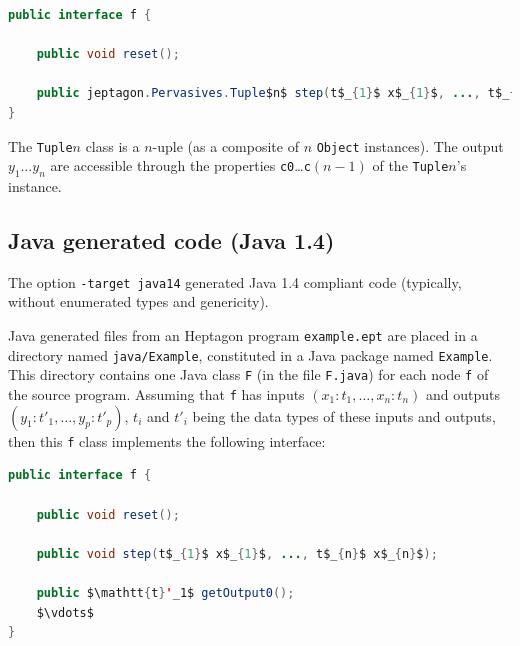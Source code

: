 \documentclass[a4paper]{article}
\begin{document}
\begin{lstlisting}[language=Java]
public interface f {
    
    public void reset();

    public jeptagon.Pervasives.Tuple$n$ step(t$_{1}$ x$_{1}$, ..., t$_{n}$ x$_{n}$);
}
\end{lstlisting}

The \texttt{Tuple$n$} class is a $n$-uple (as a composite of $n$ \texttt{Object}
instances). The output $y_1\ldots y_n$ are accessible through the properties
\texttt{c0}\ldots\texttt{c$(n-1)$} of the \texttt{Tuple$n$}'s instance.

\subsection{Java generated code (Java 1.4)}
\label{sec:java14-generated-code}

The option \texttt{-target java14} generated Java 1.4 compliant code (typically,
without enumerated types and genericity).

Java generated files from an Heptagon program \texttt{example.ept} are placed in
a directory named \texttt{java/Example}, constituted in a Java package named
\texttt{Example}. This directory contains one Java class \texttt{F} (in the file
\texttt{F.java}) for each node \texttt{f} of the source program. Assuming that
\texttt{f} has inputs $(x_1:t_1,\ldots,x_n:t_n)$ and outputs
$(y_1:t'_1,\ldots,y_p:t'_p)$, $t_i$ and $t'_i$ being the data types of these
inputs and outputs, then this \texttt{f} class implements the following
interface:

\begin{lstlisting}[language=Java]
public interface f {
    
    public void reset();

    public void step(t$_{1}$ x$_{1}$, ..., t$_{n}$ x$_{n}$);

    public $\mathtt{t}'_1$ getOutput0();
    $\vdots$
}
\end{lstlisting}




\end{document}
